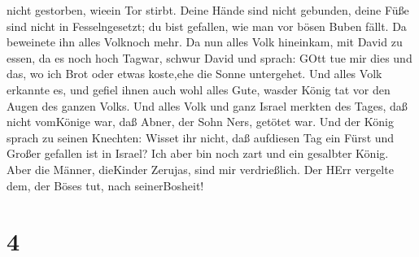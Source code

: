 nicht gestorben, wieein Tor stirbt.  Deine Hände sind nicht
gebunden, deine Füße sind nicht in Fesselngesetzt; du bist gefallen, wie
man vor bösen Buben fällt. Da beweinete ihn alles Volknoch mehr.
 Da nun alles Volk hineinkam, mit David zu essen, da es
noch hoch Tagwar, schwur David und sprach: GOtt tue mir dies und das, wo
ich Brot oder etwas koste,ehe die Sonne untergehet.  Und
alles Volk erkannte es, und gefiel ihnen auch wohl alles Gute, wasder
König tat vor den Augen des ganzen Volks.  Und alles Volk
und ganz Israel merkten des Tages, daß nicht vomKönige war, daß Abner,
der Sohn Ners, getötet war.  Und der König sprach zu seinen
Knechten: Wisset ihr nicht, daß aufdiesen Tag ein Fürst und Großer
gefallen ist in Israel?  Ich aber bin noch zart und ein
gesalbter König. Aber die Männer, dieKinder Zerujas, sind mir
verdrießlich. Der HErr vergelte dem, der Böses tut, nach seinerBosheit!

\hypertarget{section-3}{%
\section{4}\label{section-3}}

